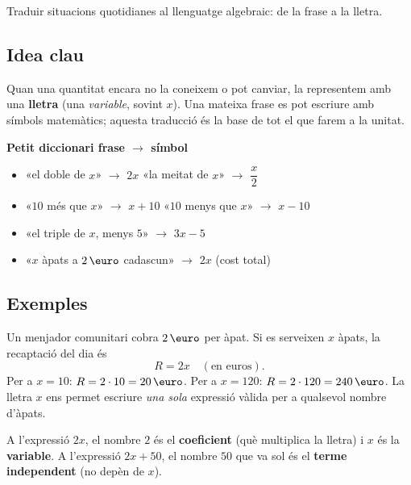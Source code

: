 %
{Traduir situacions quotidianes al llenguatge algebraic: de la frase a la lletra.}

\subsection{Idea clau}

Quan una quantitat encara no la coneixem o pot canviar, la representem amb una
\textbf{lletra} (una \emph{variable}, sovint $x$). Una mateixa frase es pot escriure
amb símbols matemàtics; aquesta traducció és la base de tot el que farem a la unitat.

\begin{idea}
\textbf{Petit diccionari frase $\rightarrow$ símbol}
\begin{itemize}[leftmargin=1.4em, itemsep=2pt]
  \item «el doble de $x$» $\rightarrow$ $2x$ \qquad «la meitat de $x$» $\rightarrow$ $\dfrac{x}{2}$
  \item «$10$ més que $x$» $\rightarrow$ $x+10$ \qquad «$10$ menys que $x$» $\rightarrow$ $x-10$
  \item «el triple de $x$, menys $5$» $\rightarrow$ $3x-5$
  \item «$x$ àpats a $2\eur$ cadascun» $\rightarrow$ $2x$ (cost total)
\end{itemize}
\end{idea}

\subsection{Exemples}

\begin{exemple}
Un menjador comunitari cobra $2\eur$ per àpat. Si es serveixen $x$ àpats,
la recaptació del dia és
\[
R = 2x \quad(\text{en euros}).
\]
Per a $x=10$: $R=2\per 10 = 20\eur$. \quad Per a $x=120$: $R=2\per 120 = 240\eur$.
La lletra $x$ ens permet escriure \emph{una sola} expressió vàlida per a qualsevol nombre d'àpats.
\end{exemple}

\begin{exemple}
A l'expressió $2x$, el nombre $2$ és el \textbf{coeficient} (què multiplica la lletra)
i $x$ és la \textbf{variable}. A l'expressió $2x+50$, el nombre $50$ que va sol
és el \textbf{terme independent} (no depèn de $x$).
\end{exemple}

